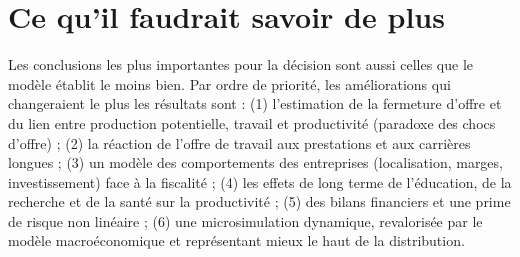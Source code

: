\section{Ce qu'il faudrait savoir de plus}

Les conclusions les plus importantes pour la décision sont aussi celles que le modèle établit le moins bien. Par ordre de
priorité, les améliorations qui changeraient le plus les résultats sont : (1) l'estimation de la fermeture d'offre et du
lien entre production potentielle, travail et productivité (paradoxe des chocs d'offre) ; (2) la réaction de l'offre de
travail aux prestations et aux carrières longues ; (3) un modèle des comportements des entreprises (localisation, marges,
investissement) face à la fiscalité ; (4) les effets de long terme de l'éducation, de la recherche et de la santé sur la
productivité ; (5) des bilans financiers et une prime de risque non linéaire ; (6) une microsimulation dynamique,
revalorisée par le modèle macroéconomique et représentant mieux le haut de la distribution.
